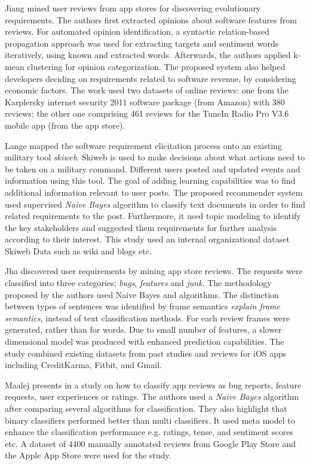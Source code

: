 Jiang \etal \cite{Jiang:2014} mined user reviews from app stores for discovering
evolutionary requirements. The authors first extracted opinions about software
features from reviews. For automated opinion identification, a syntactic
relation-based propagation approach was used for extracting targets and
sentiment words iteratively, using known and extracted words. Afterwards, the
authors applied k-mean clustering for opinion categorization. The proposed
system also helped developers deciding on requirements related to software
revenue, by considering economic factors. The work used two datasets of online
reviews: one from the Karplersky internet security 2011 software package (from Amazon) with 380
reviews; the other one comprising 461 reviews for the TuneIn Radio Pro V3.6
mobile app (from the app store).

Lange \etal\cite{Douglas:S2008} mapped the software requirement elicitation
process onto an existing military tool \emph{skiweb}. Skiweb is used to make
decisions about what actions need to be taken on a military
command.
Different users posted and updated events and information using this tool. The goal of
adding learning capabilities was to find additional information relevant to user
posts. The proposed recommender system used supervised \emph{Naive Bayes}
algorithm to classify text documents in order to find related requirements to
the post. Furthermore, it used topic modeling to identify the key stakeholders
and suggested them requirements for further analysis according to their
interest. This study used an internal organizational
dataset Skiweb Data such as wiki and blogs etc.

Jha \etal \cite{Jha:2017} discovered user requirements by mining app store
reviews. The requests were classified into three categories; \emph{bugs},
\emph{features} and \emph{junk}. The methodology proposed by the authors used
Naive Bayes and \SVM algorithms. The distinction between types of sentences was
identified by frame semantics \emph{explain frame semantics}, instead of text
classification methods. For each review frames were generated, rather than for
words. Due to small number of features, a slower
dimensional model was produced with enhanced prediction capabilities. The
study combined existing datasets from past studies and reviews for iOS apps
including CreditKarma, Fitbit, and Gmail.

Maalej \etal presents in \cite{Maalej} a study on how to classify app reviews as
bug reports, feature requests, user experiences or ratings. The authors used a
\emph{Naive Bayes} algorithm after comparing several algorithms for
classification. They also highlight that binary classifiers performed better
than multi classifiers. It
used meta model to enhance the classification performance e.g.
ratings, tense, and sentiment scores etc. A dataset of 4400 manually annotated
reviews from Google Play Store and the Apple App Store were used for the study.


